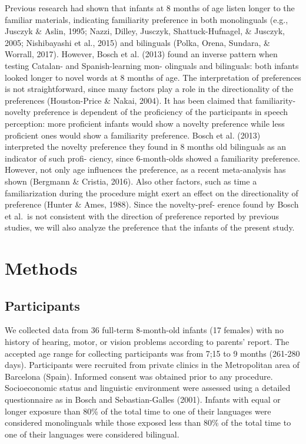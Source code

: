 \documentclass[man,floatsintext]{apa6}
\begin{document}
Previous research had shown that infants at 8 months of age listen longer to the familiar materials, indicating familiarity preference in both monolinguals (e.g., Jusczyk \& Aslin, 1995; Nazzi, Dilley, Jusczyk, Shattuck-Hufnagel, \& Jusczyk, 2005; Nishibayashi et al., 2015) and bilinguals (Polka, Orena, Sundara, \& Worrall, 2017). However, Bosch et al. (2013) found an inverse pattern when testing Catalan- and Spanish-learning mon- olinguals and bilinguals: both infants looked longer to novel words at 8 months of age. The interpretation of preferences is not straightforward, since many factors play a role in the directionality of the preferences (Houston-Price \& Nakai, 2004). It has been claimed that familiarity-novelty preference is dependent of the proficiency of the participants in speech perception: more proficient infants would show a novelty preference while less proficient ones would show a familiarity preference. Bosch et al. (2013) interpreted the novelty preference they found in 8 months old bilinguals as an indicator of such profi- ciency, since 6-month-olds showed a familiarity preference. However, not only age influences the preference, as a recent meta-analysis has shown (Bergmann \& Cristia, 2016). Also other factors, such as time a familiarization during the procedure might exert an effect on the directionality of preference (Hunter \& Ames, 1988). Since the novelty-pref- erence found by Bosch et al.~is not consistent with the direction of preference reported by previous studies, we will also analyze the preference that the infants of the present study.

\hypertarget{methods}{%
\section{Methods}\label{methods}}

\hypertarget{participants}{%
\subsection{Participants}\label{participants}}

We collected data from 36 full-term 8-month-old infants (17 females) with no history of hearing, motor, or vision problems according to parents' report. The accepted age range for collecting participants was from 7;15 to 9 months (261-280 days). Participants were recruited from private clinics in the Metropolitan area of Barcelona (Spain). Informed consent was obtained prior to any procedure. Socioeconomic status and linguistic environment were assessed using a detailed questionnaire as in Bosch and Sebastian-Galles (2001). Infants with equal or longer exposure than 80\% of the total time to one of their languages were considered monolinguals while those exposed less than 80\% of the total time to one of their languages were considered bilingual.
\end{document}
